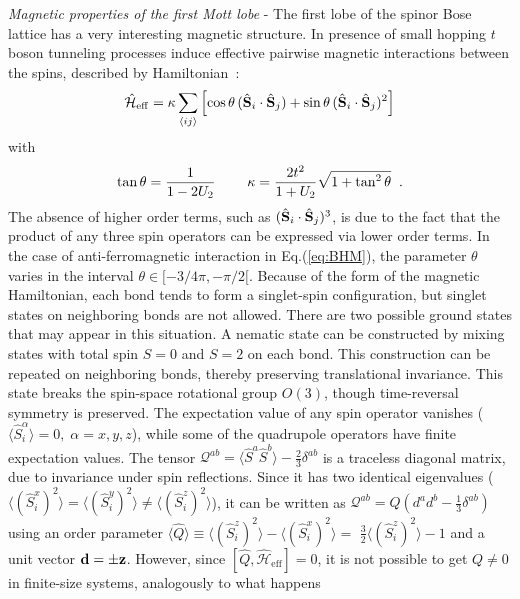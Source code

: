 \documentclass[prl,twocolumn,superscriptaddress,showpacs,floatfix]{revtex4}
\newcommand{\beq}{\begin{equation}}
\newcommand{\eeq}{\end{equation}}
\newcommand{\vett}[1]{{\bf #1}}
\newcommand{\Ham}{\mathcal H}
\newcommand{\op}[1]{\hat{#1}}
\begin{document}
{\em Magnetic properties of the first Mott lobe} - The first lobe 
of the spinor Bose lattice has a very interesting magnetic structure.
In presence of small hopping $t$ boson tunneling processes induce 
effective pairwise magnetic interactions between the spins, described by
Hamiltonian~\cite{imambekov03}:
\begin{equation}
\label{eq:mapping}
\op{\Ham}_{\mathrm{eff}} = 
\kappa \sum_{\langle i j \rangle} \left[ \cos \theta \,
( \op{\vett{S}}_i \cdot \op{\vett{S}}_j )
+ \sin \theta \, ( \op{\vett{S}}_i \cdot \op{\vett{S}}_j )^2
\right]
\end{equation}
with
\beq
\tan \theta = \frac{1}{1-2 U_2} \hspace{8mm} \kappa = \frac{2 t^2}{1+U_2}
\sqrt{1+\tan^2 \theta} \;\; .
\eeq
The absence of higher order terms, such as
$( \op{\vett{S}}_i \cdot \op{\vett{S}}_j )^{3}$, is due to the fact
that the product of any three spin operators can be expressed via lower order
terms. In the case of anti-ferromagnetic interaction in Eq.(\ref{eq:BHM}), 
the parameter $\theta$ varies in the interval $\theta \in [-3/4 \pi, -\pi /2[$.
Because of the form of the magnetic Hamiltonian, each bond tends to 
form a singlet-spin configuration, but singlet states on neighboring bonds 
are not allowed. 
There are two possible ground states that may appear in this situation. 
A nematic state can be constructed by mixing states with total spin 
$S=0$ and $S=2$ on each bond. This construction can be repeated on 
neighboring bonds, thereby preserving translational invariance.
This state breaks the spin-space rotational group $O(3)$, though time-reversal
symmetry is preserved. The expectation value of any spin operator vanishes
($\langle \op{S}^\alpha_i \rangle = 0 , \; \alpha= x,y,z$),
while some of the quadrupole operators have finite expectation values.
The tensor $\mathcal{Q}^{ab} = \langle \op{S}^a \op{S}^b \rangle
- \frac{2}{3} \delta^{ab}$ is a traceless diagonal matrix,
due to invariance under spin reflections.
Since it has two identical eigenvalues ($\langle (\op{S}^x_i)^2 \rangle =
\langle (\op{S}^y_i)^2 \rangle \neq \langle (\op{S}^z_i)^2 \rangle$),
it can be written as
$\mathcal{Q}^{ab} = Q \left( d^a d^b - \frac{1}{3} \delta^{ab} \right)$
using an order parameter
$
\langle \op{Q} \rangle \equiv \langle (\op{S}^z_i)^2 \rangle - \langle
(\op{S}^x_i)^2 \rangle =$
$\frac{3}{2} \langle (\op{S}^z_i)^2 \rangle - 1
$
and a unit vector $\vett{d}= \pm \vett{z}$.
However, since $[ \op{Q},\op{\Ham}_{\mathrm{eff}} ] =0$, it is not possible
to get $Q \neq 0$ in finite-size systems, analogously to what happens
\end{document}
